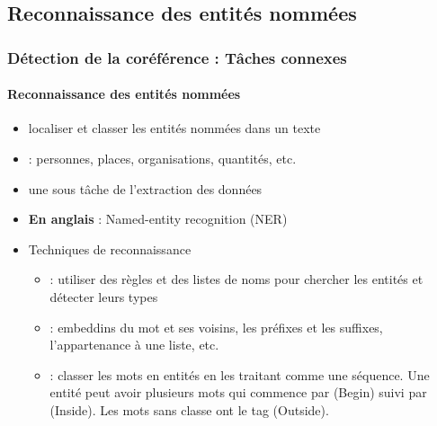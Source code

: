 \documentclass[xcolor=table]{beamer}
\begin{document}
\subsection{Reconnaissance des entités nommées}

\begin{frame}
	\frametitle{Détection de la coréférence : Tâches connexes}
	\framesubtitle{Reconnaissance des entités nommées}
	
	\begin{itemize}
		\item localiser et classer les entités nommées dans un texte
		\item {} : personnes, places, organisations, quantités, etc.
		\item une sous tâche de l'extraction des données
		\item \textbf{En anglais} : Named-entity recognition (NER)
		\item Techniques de reconnaissance 
		\begin{itemize}
			\item {} : utiliser des règles et des listes de noms pour chercher les entités et détecter leurs types
			\item {} : embeddins du mot et ses voisins, les préfixes et les suffixes, l'appartenance à une liste, etc.
			\item {} : classer les mots en entités en les traitant comme une séquence. Une entité peut avoir plusieurs mots qui commence par  (Begin) suivi par  (Inside). Les mots sans classe ont le tag  (Outside). 
			
		\end{itemize}
	\end{itemize}
	
\end{frame}


\end{document}
